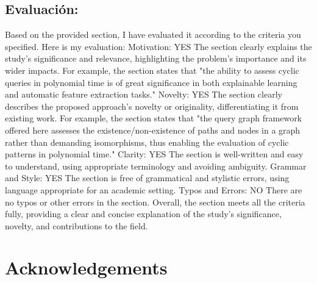 \documentclass{article}%
\begin{document}
\subsection{Evaluación:}%
\label{subsec:Evaluacin}%
\newline%
Based on the provided section, I have evaluated it according to the criteria you specified. Here is my evaluation:\newline%
\newline%
Motivation:  YES\newline%
The section clearly explains the study's significance and relevance, highlighting the problem's importance and its wider impacts. For example, the section states that "the ability to assess cyclic queries in polynomial time is of great significance in both explainable learning and automatic feature extraction tasks."\newline%
\newline%
Novelty:  YES\newline%
The section clearly describes the proposed approach's novelty or originality, differentiating it from existing work. For example, the section states that "the query graph framework offered here assesses the existence/non{-}existence of paths and nodes in a graph rather than demanding isomorphisms, thus enabling the evaluation of cyclic patterns in polynomial time."\newline%
\newline%
Clarity:  YES\newline%
The section is well{-}written and easy to understand, using appropriate terminology and avoiding ambiguity.\newline%
\newline%
Grammar and Style:  YES\newline%
The section is free of grammatical and stylistic errors, using language appropriate for an academic setting.\newline%
\newline%
Typos and Errors:  NO\newline%
There are no typos or other errors in the section.\newline%
\newline%
Overall, the section meets all the criteria fully, providing a clear and concise explanation of the study's significance, novelty, and contributions to the field.

%
\newpage%
\section*{Acknowledgements}
\end{document}
